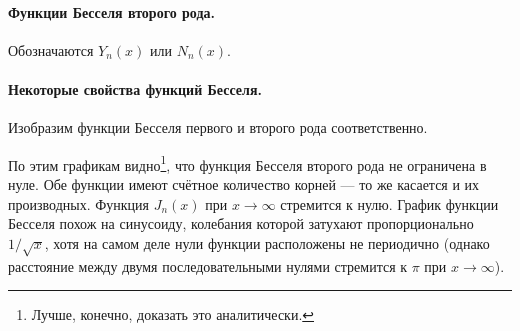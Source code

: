\paragraph{Функции Бесселя второго рода.}
Обозначаются $ Y_n(x) $ или $ N_n(x) $.

\paragraph{Некоторые свойства функций Бесселя.}
Изобразим функции Бесселя первого и второго рода соответственно.





По этим графикам видно\footnote{Лучше, конечно, доказать это аналитически.}, что
функция Бесселя второго рода не ограничена в нуле. Обе функции имеют счётное
количество корней --- то же касается и их производных. Функция $ J_n(x) $ при $
x\to\infty$ стремится к нулю. График функции Бесселя похож на
синусоиду, колебания которой затухают пропорционально $1/\sqrt{x}$, хотя на самом деле нули функции расположены не периодично (однако расстояние между двумя последовательными нулями стремится к 
$\pi$ при $x\to \infty $).
